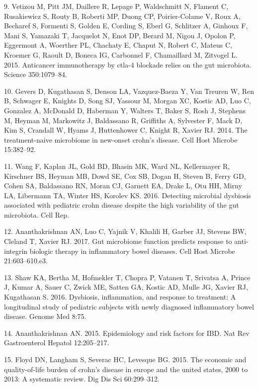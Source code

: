 \documentclass[11pt,]{article}
\begin{document}
\hypertarget{ref-Vetizou_cancer_2015}{}
9. Vetizou M, Pitt JM, Daillere R, Lepage P, Waldschmitt N, Flament C,
Rusakiewicz S, Routy B, Roberti MP, Duong CP, Poirier-Colame V, Roux A,
Becharef S, Formenti S, Golden E, Cording S, Eberl G, Schlitzer A,
Ginhoux F, Mani S, Yamazaki T, Jacquelot N, Enot DP, Berard M, Nigou J,
Opolon P, Eggermont A, Woerther PL, Chachaty E, Chaput N, Robert C,
Mateus C, Kroemer G, Raoult D, Boneca IG, Carbonnel F, Chamaillard M,
Zitvogel L. 2015. Anticancer immunotherapy by ctla-4 blockade relies on
the gut microbiota. Science 350:1079--84.

\hypertarget{ref-gevers_pedsCD_2014}{}
10. Gevers D, Kugathasan S, Denson LA, Vazquez-Baeza Y, Van Treuren W,
Ren B, Schwager E, Knights D, Song SJ, Yassour M, Morgan XC, Kostic AD,
Luo C, Gonzalez A, McDonald D, Haberman Y, Walters T, Baker S, Rosh J,
Stephens M, Heyman M, Markowitz J, Baldassano R, Griffiths A, Sylvester
F, Mack D, Kim S, Crandall W, Hyams J, Huttenhower C, Knight R, Xavier
RJ. 2014. The treatment-naive microbiome in new-onset crohn's disease.
Cell Host Microbe 15:382--92.

\hypertarget{ref-wang_pedsCD_2016}{}
11. Wang F, Kaplan JL, Gold BD, Bhasin MK, Ward NL, Kellermayer R,
Kirschner BS, Heyman MB, Dowd SE, Cox SB, Dogan H, Steven B, Ferry GD,
Cohen SA, Baldassano RN, Moran CJ, Garnett EA, Drake L, Otu HH, Mirny
LA, Libermann TA, Winter HS, Korolev KS. 2016. Detecting microbial
dysbiosis associated with pediatric crohn disease despite the high
variability of the gut microbiota. Cell Rep.

\hypertarget{ref-Ananthakrishnan_IBD_2017}{}
12. Ananthakrishnan AN, Luo C, Yajnik V, Khalili H, Garber JJ, Stevens
BW, Cleland T, Xavier RJ. 2017. Gut microbiome function predicts
response to anti-integrin biologic therapy in inflammatory bowel
diseases. Cell Host Microbe 21:603--610.e3.

\hypertarget{ref-Shaw_response_2016}{}
13. Shaw KA, Bertha M, Hofmekler T, Chopra P, Vatanen T, Srivatsa A,
Prince J, Kumar A, Sauer C, Zwick ME, Satten GA, Kostic AD, Mulle JG,
Xavier RJ, Kugathasan S. 2016. Dysbiosis, inflammation, and response to
treatment: A longitudinal study of pediatric subjects with newly
diagnosed inflammatory bowel disease. Genome Med 8:75.

\hypertarget{ref-ananthakrishnan_epidemiology_2015}{}
14. Ananthakrishnan AN. 2015. Epidemiology and risk factors for IBD. Nat
Rev Gastroenterol Hepatol 12:205--217.

\hypertarget{ref-floyd_economicburden_2015}{}
15. Floyd DN, Langham S, Severac HC, Levesque BG. 2015. The economic and
quality-of-life burden of crohn's disease in europe and the united
states, 2000 to 2013: A systematic review. Dig Dis Sci 60:299--312.
\end{document}
